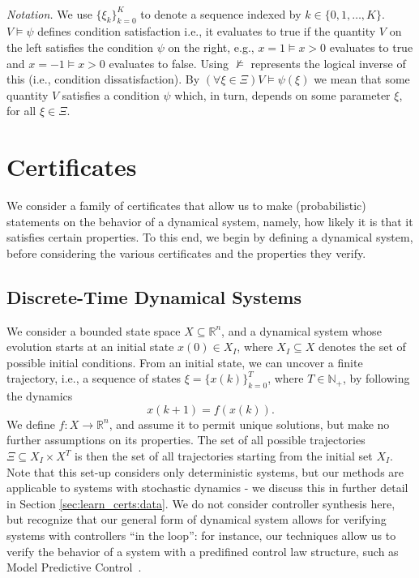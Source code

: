 \\

\emph{Notation.}
We use $\{\xi_k\}_{k=0}^K$ to denote a sequence indexed by $k \in \{0,1,\dots,K \}$. $V \models \psi$ defines condition satisfaction i.e., it evaluates to true if the quantity $V$ on the left satisfies the condition $\psi$ on the right, e.g., $x = 1 \models x > 0$ evaluates to true and $x=-1 \models x > 0$ evaluates to false.  Using $\not\models$ represents the logical inverse of this (i.e., condition dissatisfaction). By $(\forall \xi \in \Xi) V\models\psi(\xi)$ we mean that some quantity $V$ satisfies a condition $\psi$ which, in turn, depends on some parameter $\xi$, for all $\xi \in \Xi$.

\section{Certificates}
\label{sec:certs}

We consider a family of certificates that allow us to make (probabilistic) statements on the behavior of a dynamical system, namely, how likely it is that it satisfies certain properties.
To this end, we begin by defining a dynamical system, before considering the various certificates and the properties they verify.

\subsection{Discrete-Time Dynamical Systems}

We consider a bounded state space $X \subseteq \mathbb{R}^n$, and a dynamical system whose evolution starts at an initial state $x(0) \in X_I$, where $X_I\subseteq X$ denotes the set of possible initial conditions. 
From an initial state, we can uncover a finite trajectory, i.e., a sequence of states $\xi = \{x(k)\}_{k=0}^T$, where $T\in \mathbb{N}_+$, by following the dynamics
\begin{equation}
\label{eq:Dyn}
    x(k+1)=f(x(k)).
\end{equation}
We define $f \colon X \rightarrow \mathbb{R}^n$, and assume it to permit unique solutions, but make no further assumptions on its properties.
The set of all possible trajectories $\Xi \subseteq X_I \times X^{T}$ is then the set of all trajectories starting from the initial set $X_I$.
Note that this set-up considers only deterministic systems, but our methods are applicable to systems with stochastic dynamics - we discuss this in further detail in Section \ref{sec:learn_certs:data}. 
We do not consider controller synthesis here, but recognize that our general form of dynamical system allows for verifying systems with controllers ``in the loop'': for instance, our techniques allow us to verify the behavior of a system with a predifined control law structure, such as Model Predictive Control~\cite{DBLP:journals/automatica/GarciaPM89}.

